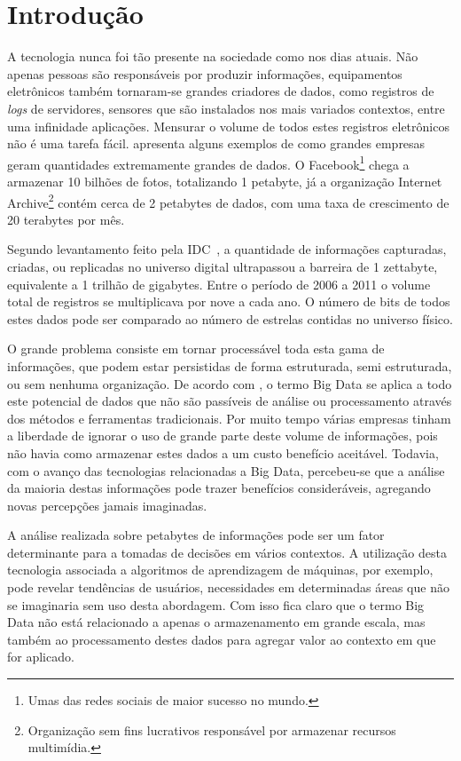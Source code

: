 \chapter{Introdução}
 
A tecnologia nunca foi tão presente na sociedade como nos dias atuais. Não apenas pessoas são responsáveis por produzir informações, equipamentos eletrônicos também tornaram-se grandes criadores de dados, como registros de \textit{logs} de servidores, sensores que são instalados nos mais variados contextos, entre uma infinidade aplicações. Mensurar o volume de todos estes registros eletrônicos não é uma tarefa fácil.  apresenta alguns exemplos de como grandes empresas geram quantidades extremamente grandes de dados. O Facebook\footnote{Umas das redes sociais de maior sucesso no mundo.} chega a armazenar 10 bilhões de fotos, totalizando 1 petabyte, já a organização Internet Archive\footnote{Organização sem fins lucrativos responsável por armazenar recursos multimídia.} contém cerca de 2 petabytes de dados, com uma taxa de crescimento de 20 terabytes por mês.

Segundo levantamento feito pela IDC~\cite{gantz2011}, a quantidade de informações capturadas, criadas, ou replicadas no universo digital ultrapassou a barreira de 1 zettabyte, equivalente a 1 trilhão de gigabytes. Entre o período de 2006 a 2011 o volume total de registros se multiplicava por nove a cada ano. O número de bits de todos estes dados pode ser comparado ao número de estrelas contidas no universo físico.

O grande problema consiste em tornar processável toda esta gama de informações, que podem estar persistidas de forma estruturada, semi estruturada, ou sem nenhuma organização. De acordo com , o termo Big Data se aplica a todo este potencial de dados que não são passíveis de análise ou processamento através dos métodos e ferramentas tradicionais. Por muito tempo várias empresas tinham a liberdade de ignorar o uso de grande parte deste volume de informações, pois não havia como armazenar estes dados a um custo benefício aceitável. Todavia, com o avanço das tecnologias relacionadas a Big Data, percebeu-se que a análise da maioria destas informações pode trazer benefícios consideráveis, agregando novas percepções jamais imaginadas.

A análise realizada sobre petabytes de informações pode ser um fator determinante para a tomadas de decisões em vários contextos. A utilização desta tecnologia associada a algoritmos de aprendizagem de máquinas, por exemplo, pode revelar tendências de usuários, necessidades em determinadas áreas que não se imaginaria sem uso desta abordagem. Com isso fica claro que o termo Big Data não está relacionado a apenas o armazenamento em grande escala, mas também ao processamento destes dados para agregar valor ao contexto em que for aplicado.

